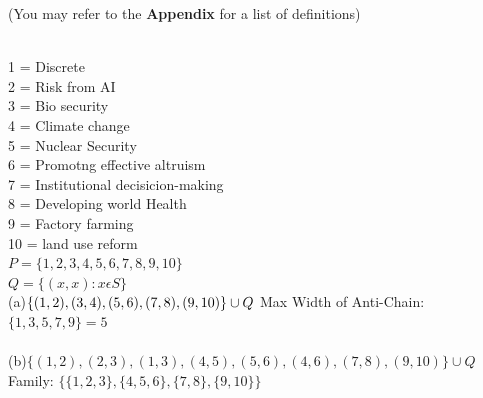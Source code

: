 \documentclass[addpoints]{exam}
\begin{document}
\begin{questions}

(You may refer to the \textbf{Appendix} for a list of definitions)


  \begin{solution}
  \\
    1 = Discrete\\
    2 = Risk from AI\\
    3 = Bio security\\
    4 = Climate change\\
    5 = Nuclear Security\\
    6 = Promotng effective altruism\\
    7 = Institutional decisicion-making\\
    8 = Developing world Health\\
    9 = Factory farming\\
    10 = land use reform\\
    
    $P = \{1,2,3,4,5,6,7,8,9,10\}$\\
     $Q = \{(x,x): x \epsilon S\}$\\
    
    (a)$\{(1,2),(3,4),(5,6),(7,8),(9,10)\} \cup Q\\$ Max Width of Anti-Chain: $\{1,3,5,7,9\}= 5$\\
    \\
    (b)$\{(1,2),(2,3),(1,3),(4,5),(5,6),(4,6),(7,8),(9,10)\} \cup Q$\\
    Family: $\{\{1,2,3\},\{4,5,6\},\{7,8\},\{9,10\}\}$\\
    

\end{solution}
\end{questions}
\end{document}
